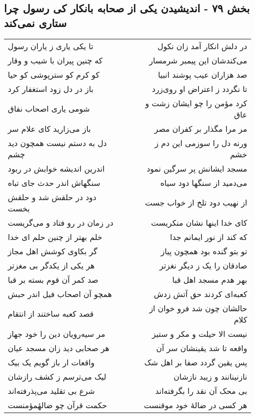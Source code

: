 \begin{center}
\section*{بخش ۷۹ - اندیشیدن یکی از صحابه بانکار کی رسول چرا ستاری نمی‌کند}
\label{sec:sh079}
\begin{longtable}{l p{0.5cm} r}
تا یکی یاری ز یاران رسول
&&
در دلش انکار آمد زان نکول
\\
که چنین پیران با شیب و وقار
&&
می‌کندشان این پیمبر شرمسار
\\
کو کرم کو سترپوشی کو حیا
&&
صد هزاران عیب پوشند انبیا
\\
باز در دل زود استغفار کرد
&&
تا نگردد ز اعتراض او روی‌زرد
\\
شومی یاری اصحاب نفاق
&&
کرد مؤمن را چو ایشان زشت و عاق
\\
باز می‌زارید کای علام سر
&&
مر مرا مگذار بر کفران مصر
\\
دل به دستم نیست همچون دید چشم
&&
ورنه دل را سوزمی این دم ز خشم
\\
اندرین اندیشه خوابش در ربود
&&
مسجد ایشانش پر سرگین نمود
\\
سنگهاش اندر حدث جای تباه
&&
می‌دمید از سنگها دود سیاه
\\
دود در حلقش شد و حلقش بخست
&&
از نهیب دود تلخ از خواب جست
\\
در زمان در رو فتاد و می‌گریست
&&
کای خدا اینها نشان منکریست
\\
خلم بهتر از چنین حلم ای خدا
&&
که کند از نور ایمانم جدا
\\
گر بکاوی کوشش اهل مجاز
&&
تو بتو گنده بود همچون پیاز
\\
هر یکی از یکدگر بی مغزتر
&&
صادقان را یک ز دیگر نغزتر
\\
صد کمر آن قوم بسته بر قبا
&&
بهر هدم مسجد اهل قبا
\\
همچو آن اصحاب فیل اندر حبش
&&
کعبه‌ای کردند حق آتش زدش
\\
قصد کعبه ساختند از انتقام
&&
حالشان چون شد فرو خوان از کلام
\\
مر سیه‌رویان دین را خود جهاز
&&
نیست الا حیلت و مکر و ستیز
\\
هر صحابی دید زان مسجد عیان
&&
واقعه تا شد یقینشان سر آن
\\
واقعات ار باز گویم یک بیک
&&
پس یقین گردد صفا بر اهل شک
\\
لیک می‌ترسم ز کشف رازشان
&&
نازنینانند و زیبد نازشان
\\
شرع بی تقلید می‌پذرفته‌اند
&&
بی محک آن نقد را بگرفته‌اند
\\
حکمت قرآن چو ضالهٔمؤمنست
&&
هر کسی در ضالهٔ خود موقنست
\\
\end{longtable}
\end{center}
